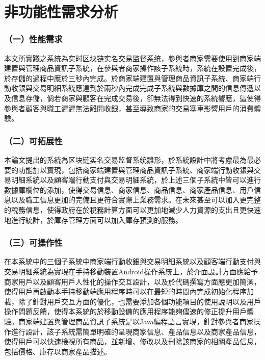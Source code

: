 	\section{非功能性需求分析}

	\subsubsection{（一）性能需求}
	
	本文所實踐之系統為实时区块链实名交易监督系统，參與者商家需要使用到商家端建置與管理商品資訊子系統，在參與者商家操作該子系統時，系統在設置完成後，於存儲的過程中應於三秒內完成。於商家端建置與管理商品資訊子系統、商家端行動收銀與交易明細系統應達到於兩秒內完成完成子系統與數據庫之間的信息傳遞以及信息存儲，倘若商家與顧客在完成交易後，卻無法得到快速的系統響應，這使得參與者顧客與職工遲遲無法離開收銀，甚至導致商家的交易塞車影響用戶的消費體驗。

	\subsubsection{（二）可拓展性}

	本論文提出的系統為区块链实名交易监督系统雛形，於系統設計中將考慮最為最必要的功能加以實現，包括商家端建置與管理商品資訊子系統、商家端行動收銀與交易明細系統以及顧客端行動支付與交易明細系統，於上述三個子系統中皆可以進行數據庫欄位的添加，使得交易信息、商家信息、商品信息、商家產品信息、用戶信息以及職工信息更加的完備且更符合實際上業務需求。在未來甚至可以加入更完整的稅務信息，使得政府在於稅務計算方面可以更加地減少人力資源的支出且更快速地進行統計，於庫存管理方面可以加入庫存預測的服務。

	\subsubsection{（三）可操作性}
	在本系統中的三個子系統中商家端行動收銀與交易明細系統以及顧客端行動支付與交易明細系統為實現在手持移動裝置Android操作系統上，於介面設計方面應給予商家用戶以及顧客用戶人性化的操作交互設計，以及於代碼撰寫方面應更加簡潔，使得用戶再啟動本手持移動端應用程序時可以在最短的時間內完成初始化程序加載，除了針對用戶交互方面的優化，也需要添加各個功能項目的使用說明以及用戶操作問題反饋，使得本系統的於移動設備的應用程序能夠儘速的修正提升用戶體驗。商家端建置與管理商品資訊子系統是以Java編程語言實現，針對參與者商家操作進行設計，該子系統需簡單明確的呈現商家信息、產品信息以及商家產品信息，使得用戶可以快速檢視所有商品，並新增、修改以及刪除該商家的相關產品信息，包括價格、庫存以商家產品描述。


